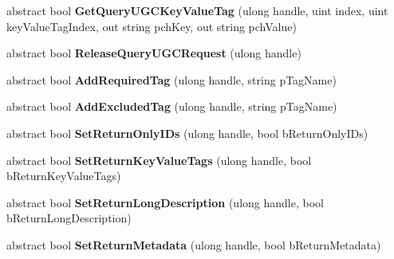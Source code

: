 \begin{DoxyCompactItemize}
abstract bool {\bfseries Get\+Query\+U\+G\+C\+Key\+Value\+Tag} (ulong handle, uint index, uint key\+Value\+Tag\+Index, out string pch\+Key, out string pch\+Value)
\item 
\mbox{\label{class_valve_1_1_steamworks_1_1_i_steam_u_g_c_aaac1edef3b58b4a7c9ea2f70ab640699}} 
abstract bool {\bfseries Release\+Query\+U\+G\+C\+Request} (ulong handle)
\item 
\mbox{\label{class_valve_1_1_steamworks_1_1_i_steam_u_g_c_afd02491f5e314ac3b99a1326e377f569}} 
abstract bool {\bfseries Add\+Required\+Tag} (ulong handle, string p\+Tag\+Name)
\item 
\mbox{\label{class_valve_1_1_steamworks_1_1_i_steam_u_g_c_acd075382a6786ae99d2c9e5aec72a5f0}} 
abstract bool {\bfseries Add\+Excluded\+Tag} (ulong handle, string p\+Tag\+Name)
\item 
\mbox{\label{class_valve_1_1_steamworks_1_1_i_steam_u_g_c_a9f9bcd9aa8faccd045a7da65223d61de}} 
abstract bool {\bfseries Set\+Return\+Only\+I\+Ds} (ulong handle, bool b\+Return\+Only\+I\+Ds)
\item 
\mbox{\label{class_valve_1_1_steamworks_1_1_i_steam_u_g_c_aeaf5498705eae39845d5c3553d283930}} 
abstract bool {\bfseries Set\+Return\+Key\+Value\+Tags} (ulong handle, bool b\+Return\+Key\+Value\+Tags)
\item 
\mbox{\label{class_valve_1_1_steamworks_1_1_i_steam_u_g_c_ab8f148d1663f1ecfae61c157b1b901ba}} 
abstract bool {\bfseries Set\+Return\+Long\+Description} (ulong handle, bool b\+Return\+Long\+Description)
\item 
\mbox{\label{class_valve_1_1_steamworks_1_1_i_steam_u_g_c_ac17c1fdd4b06e7afdcd7523a7c8ef261}} 
abstract bool {\bfseries Set\+Return\+Metadata} (ulong handle, bool b\+Return\+Metadata)
\item 
\mbox{\label{class_valve_1_1_steamworks_1_1_i_steam_u_g_c_a4736772106a0e8b088a9fc139b7a53c9}} 

\end{DoxyCompactItemize}
